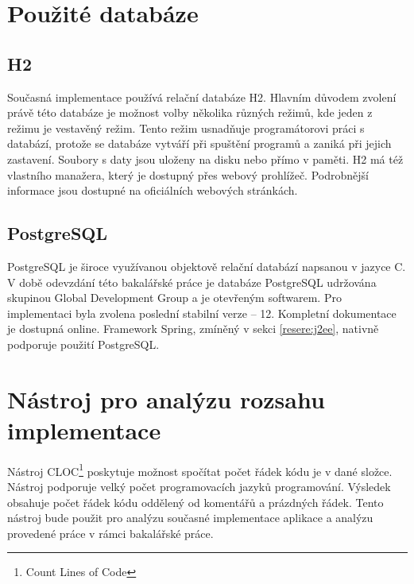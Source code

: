 \section{Použité databáze}\label{resere:databaze}

    \subsection{H2}
        Současná implementace používá relační databáze H2. Hlavním důvodem zvolení právě této databáze je možnost volby několika různých režimů, kde jeden z režimu je vestavěný režim. Tento režim usnadňuje programátorovi práci s databází, protože se databáze vytváří při spuštění programů a zaniká při jejich zastavení. Soubory s daty jsou uloženy na disku nebo přímo v paměti. H2 má též vlastního manažera, který je dostupný přes webový prohlížeč. Podrobnější informace jsou dostupné na oficiálních webových stránkách\cite{h2-doc}.
        
    \subsection{PostgreSQL}
        PostgreSQL je široce využívanou objektově relační databází napsanou v jazyce C. V době odevzdání této bakalářské práce je databáze PostgreSQL udržována skupinou Global Development Group a je otevřeným softwarem. Pro implementaci byla zvolena poslední stabilní verze -- 12. Kompletní dokumentace je dostupná online\cite{postgres-documentation}. Framework Spring, zmíněný v sekci \ref{resere:j2ee}, nativně podporuje použití PostgreSQL.
        

\section{Nástroj pro analýzu rozsahu implementace}\label{reserse:cloc}
    Nástroj CLOC\footnote{Count Lines of Code}\cite{cloc-download} poskytuje možnost spočítat počet řádek kódu je v dané složce. Nástroj podporuje velký počet programovacích jazyků programování. Výsledek obsahuje počet řádek kódu oddělený od komentářů a prázdných řádek. Tento nástroj bude použit pro analýzu současné implementace aplikace a analýzu provedené práce v rámci bakalářské práce.